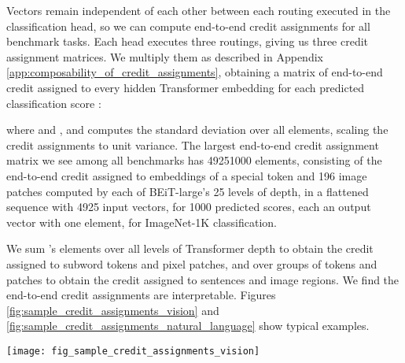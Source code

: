 \documentclass[11pt,a4paper]{article}
\begin{document}
Vectors remain independent of each other between each routing executed in the classification head, so we can compute end-to-end credit assignments for all benchmark tasks. Each head executes three routings, giving us three credit assignment matrices. We multiply them as described in Appendix \ref{app:composability_of_credit_assignments}, obtaining a matrix of end-to-end credit assigned to every hidden Transformer embedding  for each predicted classification score :



where  and , and  computes the standard deviation over all elements, scaling the credit assignments to unit variance. The largest end-to-end credit assignment matrix we see among all benchmarks has 49251000 elements, consisting of the end-to-end credit assigned to embeddings of a special token and 196 image patches computed by each of BEiT-large's 25 levels of depth, in a flattened sequence with 4925 input vectors, for 1000 predicted scores, each an output vector with one element, for ImageNet-1K classification.

We sum 's elements over all levels of Transformer depth to obtain the credit assigned to subword tokens and pixel patches, and over groups of tokens and patches to obtain the credit assigned to sentences and image regions. We find the end-to-end credit assignments are interpretable. Figures \ref{fig:sample_credit_assignments_vision} and \ref{fig:sample_credit_assignments_natural_language} show typical examples.

\begin{figure*}[t]
	\vskip 0.1in
	\begin{center}
		\centerline{\texttt{[image: fig\_sample\_credit\_assignments\_vision]}}
		\caption{Typical example of end-to-end credit assigned to Transformer hidden states in a visual task. Here, our three-layer routing head assigns credit to the dog's entire body in shallower layers, and to its nose, mouth, ears, and paws in deeper layers. The matrix of end-to-end credit assignments  has 49251000 elements, consisting of credit assigned to 197 hidden embeddings at 25 levels of Transformer depth, or 4925 input vectors, for 1000 classification scores, each an output vector with one element. We show the absolute values of 4900 credit assignments to embeddings corresponding to 196 image patches, for the highest score, excluding 25 credit assignments to a special token added to the input sequence.}
		\label{fig:sample_credit_assignments_vision}
	\end{center}
	\vskip -0.2in
\end{figure*}
\end{document}
